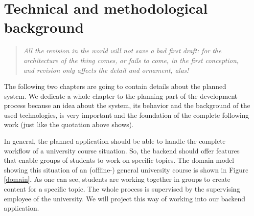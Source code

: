 \chapter[Technical and methodological background]{Technical and methodological background}
\label{background}
  \begin{verse}
    \textit{All the revision in the world will not save a bad first draft: for the architecture of the thing comes, or fails to come, in the first conception, and revision only affects the detail and ornament, alas!}\\
  \end{verse}

The following two chapters are going to contain details about the planned system. We dedicate a whole chapter to the planning part of the development process because an idea about the system, its behavior and the background of the used technologies, is very important and the foundation of the complete following work (just like the quotation above shows). 

In general, the planned application should be able to handle the complete workflow of a university course situation. So, the backend should offer features that enable groups of students to work on specific topics. The domain model showing this situation of an (offline-) general university course is shown in Figure \ref{domain}. As one can see, students are working together in groups to create content for a specific topic. The whole process is supervised by the supervising employee of the university. We will project this way of working into our backend application.

